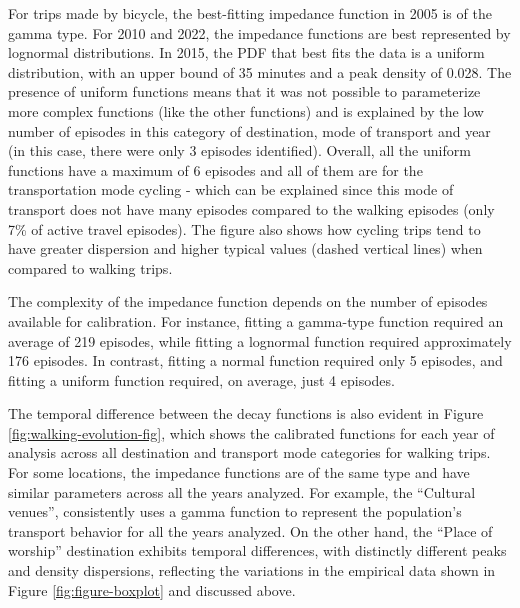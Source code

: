 \documentclass[preprint, 3p,
authoryear]{elsarticle} %
\begin{document}
For trips made by bicycle, the best-fitting impedance function in 2005
is of the gamma type. For 2010 and 2022, the impedance functions are
best represented by lognormal distributions. In 2015, the PDF that best
fits the data is a uniform distribution, with an upper bound of 35
minutes and a peak density of 0.028. The presence of uniform functions
means that it was not possible to parameterize more complex functions
(like the other functions) and is explained by the low number of
episodes in this category of destination, mode of transport and year (in
this case, there were only 3 episodes identified). Overall, all the
uniform functions have a maximum of 6 episodes and all of them are for
the transportation mode cycling - which can be explained since this mode
of transport does not have many episodes compared to the walking
episodes (only 7\% of active travel episodes). The figure also shows how
cycling trips tend to have greater dispersion and higher typical values
(dashed vertical lines) when compared to walking trips.

The complexity of the impedance function depends on the number of
episodes available for calibration. For instance, fitting a gamma-type
function required an average of 219 episodes, while fitting a lognormal
function required approximately 176 episodes. In contrast, fitting a
normal function required only 5 episodes, and fitting a uniform function
required, on average, just 4 episodes.

The temporal difference between the decay functions is also evident in
Figure \ref{fig:walking-evolution-fig}, which shows the calibrated
functions for each year of analysis across all destination and transport
mode categories for walking trips. For some locations, the impedance
functions are of the same type and have similar parameters across all
the years analyzed. For example, the ``Cultural venues'', consistently
uses a gamma function to represent the population's transport behavior
for all the years analyzed. On the other hand, the ``Place of worship''
destination exhibits temporal differences, with distinctly different
peaks and density dispersions, reflecting the variations in the
empirical data shown in Figure \ref{fig:figure-boxplot} and discussed
above.
\end{document}

